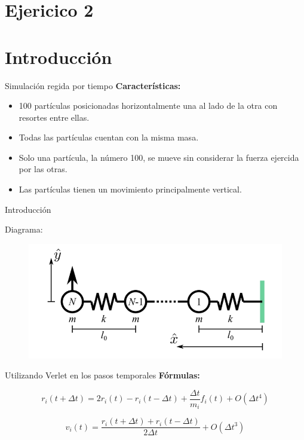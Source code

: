\section{Ejericico 2}\label{sec:ejer2}


\section{Introducción}\label{sec:introduccion}
\begin{frame}{Simulación regida por tiempo}
    \textbf{Características:}
    \begin{itemize}
        \item 100 partículas posicionadas horizontalmente una al lado de la otra con resortes entre ellas.
        \item Todas las partículas cuentan con la misma masa.
        \item Solo una partícula, la número 100, se mueve sin considerar la fuerza ejercida por las otras.
        \item Las partículas tienen un movimiento principalmente vertical.
    \end{itemize}
\end{frame}

\begin{frame}{Introducción}
    \begin{block}{Diagrama:}
        \begin{figure}
            \centering
            \includegraphics[width=0.8\linewidth]{pic/01-introduccion/diagrama}
        \end{figure}
    \end{block}
\end{frame}

\begin{frame}{Utilizando Verlet en los pasos temporales}
    \textbf{Fórmulas:}

    \vspace{5pt}
    \begin{equation*}
        r_i(t + \Delta{t}) = 2 r_i(t) - r_i(t-\Delta{t}) + \frac{\Delta{t}}{m_i} f_i(t) + O(\Delta{t}^4)
    \end{equation*}
    
    \vspace{20pt}
    \begin{equation*}
        v_i(t) = \frac{r_i(t+\Delta{t}) + r_i(t-\Delta{t})}{2\Delta{t}} + O(\Delta{t}^3)
    \end{equation*}
\end{frame}

